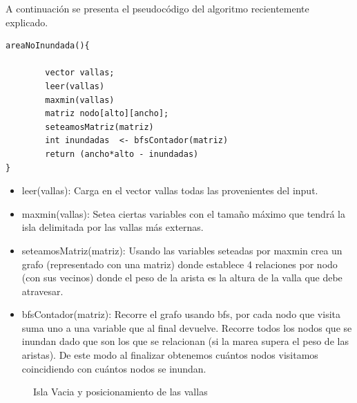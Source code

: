 \documentclass[a4paper, 12pt]{article}
\begin{document}
A continuación se presenta el pseudocódigo del algoritmo recientemente explicado.

\begin{verbatim}
areaNoInundada(){

        vector vallas;
        leer(vallas)
        maxmin(vallas)
        matriz nodo[alto][ancho];
        seteamosMatriz(matriz)
        int inundadas  <- bfsContador(matriz)
        return (ancho*alto - inundadas)
}
\end{verbatim}



\begin{itemize}
\item leer(vallas): Carga en el vector vallas todas las provenientes del input.

\item maxmin(vallas): Setea ciertas variables con el tama\~no máximo que tendrá la isla delimitada por las vallas más externas.

\item seteamosMatriz(matriz): Usando las variables seteadas por maxmin crea un grafo (representado con una matriz) donde establece 4 relaciones por nodo (con sus vecinos) donde el peso de la arista es la altura de la valla que debe atravesar.

\item bfsContador(matriz): Recorre el grafo usando bfs, por cada nodo que visita suma uno a una variable que al final devuelve. Recorre todos los nodos que se inundan dado que son los que se relacionan (si la marea supera el peso de las aristas). De este modo al finalizar obtenemos cuántos nodos visitamos coincidiendo con cuántos nodos se inundan.
\end{itemize}

\begin{figure}[H]
\centering
{}
\qquad
{}
\caption{Isla Vacia y posicionamiento de las vallas}
\end{figure}
\end{document}
